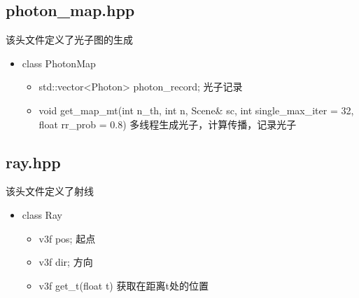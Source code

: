 \documentclass[12pt]{article}
\begin{document}
\subsection{photon\_map.hpp}
该头文件定义了光子图的生成
\begin{itemize}
    \item class PhotonMap
    \begin{itemize}
        \item std::vector<Photon> photon\_record; 光子记录
        \item void get\_map\_mt(int n\_th, int n, Scene\& sc, int single\_max\_iter = 32, float rr\_prob = 0.8) 多线程生成光子，计算传播，记录光子
    \end{itemize}
\end{itemize}


\subsection{ray.hpp}
该头文件定义了射线
\begin{itemize}
    \item class Ray
    \begin{itemize}
        \item v3f pos; 起点
        \item v3f dir; 方向
        \item v3f get\_t(float t) 获取在距离t处的位置
    \end{itemize}
\end{itemize}
\end{document}
